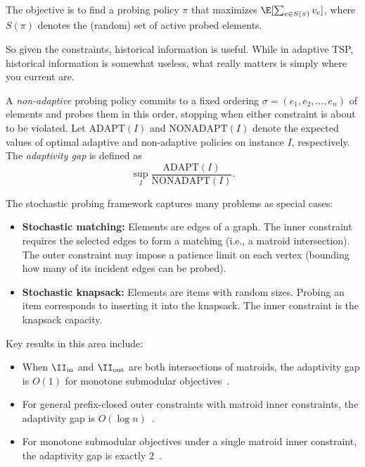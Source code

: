 The objective is to find a probing policy $\pi$ that maximizes $\E[\sum_{e \in S(\pi)} v_e]$, where $S(\pi)$ denotes the (random) set of active probed elements.

So given the constraints, historical information is useful. While in adaptive TSP, historical information is somewhat useless, what really matters is simply where you current are.

\begin{definition}
    A \emph{non-adaptive} probing policy commits to a fixed ordering $\sigma = (e_1, e_2, \dots, e_n)$ of elements and probes them in this order, stopping when either constraint is about to be violated.
    Let $\mathrm{ADAPT}(I)$ and $\mathrm{NONADAPT}(I)$ denote the expected values of optimal adaptive and non-adaptive policies on instance $I$, respectively. The \emph{adaptivity gap} is defined as
    \[
        \sup_{I} \frac{\mathrm{ADAPT}(I)}{\mathrm{NONADAPT}(I)}.
    \]
\end{definition}

The stochastic probing framework captures many problems as special cases:
\begin{itemize}
    \item \textbf{Stochastic matching:} Elements are edges of a graph. The inner constraint requires the selected edges to form a matching (i.e., a matroid intersection). The outer constraint may impose a patience limit on each vertex (bounding how many of its incident edges can be probed).
    \item \textbf{Stochastic knapsack:} Elements are items with random sizes. Probing an item corresponds to inserting it into the knapsack. The inner constraint is the knapsack capacity.
\end{itemize}

Key results in this area include:
\begin{itemize}
    \item When $\II_{\mathrm{in}}$ and $\II_{\mathrm{out}}$ are both intersections of matroids, the adaptivity gap is $O(1)$ for monotone submodular objectives~\cite{GuptaNagarajanSingla2017}.
    \item For general prefix-closed outer constraints with matroid inner constraints, the adaptivity gap is $O(\log n)$~\cite{GuptaNagarajanSingla2016}.
    \item For monotone submodular objectives under a single matroid inner constraint, the adaptivity gap is exactly $2$~\cite{BradacSinglaZuzic2019}.
\end{itemize}

